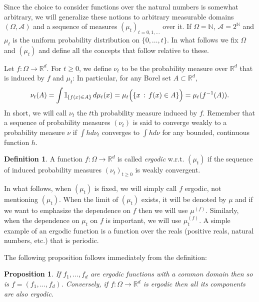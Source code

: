 \documentclass[english]{article} %
\newcommand{\cset}[2]{\left\{#1\,:\,#2\right\}}
\newcommand{\ind}[1]{\mathbb{I}_{\left\{ #1 \right\}}}
\newcommand{\ra}{\rightarrow}
\newcommand{\real}{\mathbb{R}}
\renewcommand{\natural}{\mathbb{N}}
\newtheorem{prop}[lemma]{Proposition}
\theoremstyle{definition}
\newtheorem{definition}[lemma]{Definition}
\renewcommand{\AA}{\mathcal{A}}
\begin{document}
Since the choice to consider functions over the natural numbers is somewhat arbitrary, we will generalize these notions to arbitrary measurable domains $(\Omega,\AA)$ and a sequence of measures $(\mu_t)_{t=0,1,\ldots}$ over it.
If $\Omega = \natural$, $\AA = 2^\natural$ and $\mu_t$ is the uniform probability distribution on $\{0,\ldots,t\}$.
In what follows we fix $\Omega$ and $(\mu_t)$ and define all the concepts that follow relative to these.

Let $f: \Omega \ra \real^d$.
For $t\ge 0$, we define $\nu_t$ to be the probability measure over $\real^d$ that is induced by $f$ and $\mu_t$:
In particular, for any Borel set $A\subset \real^d$,
\[
\nu_t(A)=\int \ind{f(x) \in A}\, d\mu_t(x) = \mu_t\Bigl( \cset{x}{f(x)\in A} \Bigr)
= \mu_t ( f^{-1}(A) ).
\]
In short, we will call $\nu_t$ the $t$th probability measure induced by $f$.
Remember that a sequence of probability measures $(\nu_t)$ is said to converge weakly to a probability measure $\nu$ if $\int h d\nu_t$ converges to $\int h d\nu$ for any bounded, continuous function $h$.

\begin{definition}
A function $f:\Omega \rightarrow \real^d$ is called \emph{ergodic} w.r.t. $(\mu_t)$
if the sequence of  induced probability measures $(\nu_t)_{t\ge 0}$ is weakly convergent.
\end{definition}
In what follows, when $(\mu_t)$ is fixed, we will simply call $f$  ergodic, not mentioning $(\mu_t)$.
When the limit of $(\mu_t)$ exists, it will be denoted by $\mu$
and if we want to emphasize the dependence on $f$ then we will use $\mu^{(f)}$.
Similarly, when the dependence on $\mu_t$ on $f$ is important, we will use $\mu^{(f)}_t$.
A simple example of an ergodic function is a function over the reals (positive reals, natural numbers, etc.) that is periodic.

The following proposition follows immediately from the definition:
\begin{prop}\label{prop:comp}
If $f_1,\ldots, f_d$ are ergodic functions with a common domain then so is $f = (f_1,\ldots,f_d)$. Conversely, if $f:\Omega \ra \real^d$ is ergodic then all its components are also ergodic.
\end{prop}
\end{document}
